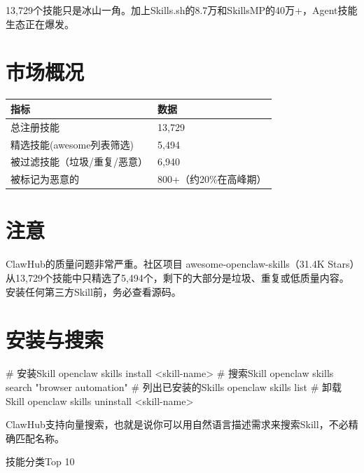 \documentclass[
  10
]{article}
\newenvironment{Shaded}{}{}
\newcommand{\NormalTok}[1]{#1}
\newcounter{none} %
\begin{document}
13,729个技能只是冰山一角。加上Skills.sh的8.7万和SkillsMP的40万+，Agent技能生态正在爆发。

\section{市场概况}\label{ux5e02ux573aux6982ux51b5}

{\def\LTcaptype{none} %
\begin{longtable}[]{@{}|l|l|@{}}
\toprule\noalign{}
\endhead
\bottomrule\noalign{}
\endlastfoot
\hline
指标 & 数据 \\
\hline
总注册技能 & 13,729 \\
\hline
精选技能(awesome列表筛选) & 5,494 \\
\hline
被过滤技能（垃圾/重复/恶意） & 6,940 \\
\hline
被标记为恶意的 & 800+（约20\%在高峰期） \\
\hline
\end{longtable}
}

\section{注意}\label{ux6ce8ux610f-11}

ClawHub的质量问题非常严重。社区项目 awesome-openclaw-skills（31.4K
Stars）从13,729个技能中只精选了5,494个，剩下的大部分是垃圾、重复或低质量内容。安装任何第三方Skill前，务必查看源码。

\section{安装与搜索}\label{ux5b89ux88c5ux4e0eux641cux7d22}

\begin{Shaded}
\begin{Highlighting}[]
\NormalTok{\# 安装Skill  }
\NormalTok{openclaw skills install \textless{}skill{-}name\textgreater{}  }
\NormalTok{\# 搜索Skill  }
\NormalTok{openclaw skills search "browser automation"  }
\NormalTok{\# 列出已安装的Skills  }
\NormalTok{openclaw skills list  }
\NormalTok{\# 卸载Skill  }
\NormalTok{openclaw skills uninstall \textless{}skill{-}name\textgreater{}}
\end{Highlighting}
\end{Shaded}

ClawHub支持向量搜索，也就是说你可以用自然语言描述需求来搜索Skill，不必精确匹配名称。

技能分类Top 10
\end{document}
